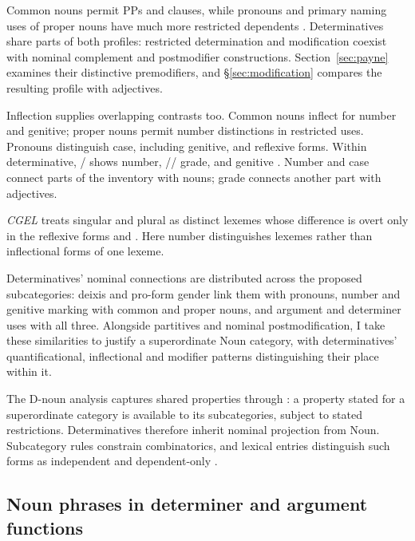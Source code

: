 \documentclass[12pt]{article}
\begin{document}
Common nouns permit PPs and clauses, while pronouns and primary naming uses of proper nouns have much more restricted dependents \citep[429--430, 439--443, 517--521]{huddleston2002}. Determinatives share parts of both profiles: restricted determination and modification coexist with nominal complement and postmodifier constructions. Section~\ref{sec:payne} examines their distinctive premodifiers, and §\ref{sec:modification} compares the resulting profile with adjectives.

Inflection supplies overlapping contrasts too. Common nouns inflect for number and genitive; proper nouns permit number distinctions in restricted uses. Pronouns distinguish case, including genitive, and reflexive forms. Within determinative, / shows number, // grade, and  genitive \citep[373, 423--424, 426, 479--480, 521]{huddleston2002}. Number and case connect parts of the inventory with nouns; grade connects another part with adjectives.

\textit{CGEL} treats singular and plural  as distinct lexemes whose difference is overt only in the reflexive forms  and  \citep[486]{huddleston2002}. Here number distinguishes lexemes rather than inflectional forms of one lexeme.

Determinatives' nominal connections are distributed across the proposed subcategories: deixis and pro-form gender link them with pronouns, number and genitive marking with common and proper nouns, and argument and determiner uses with all three. Alongside partitives and nominal postmodification, I take these similarities to justify a superordinate Noun category, with determinatives' quantificational, inflectional and modifier patterns distinguishing their place within it.

The D-noun analysis captures shared properties through : a property stated for a superordinate category is available to its subcategories, subject to stated restrictions. Determinatives therefore inherit nominal projection from Noun. Subcategory rules constrain combinatorics, and lexical entries distinguish such forms as independent  and dependent-only .

\subsection{Noun phrases in determiner and argument functions}\label{sec:bridge}
\end{document}
